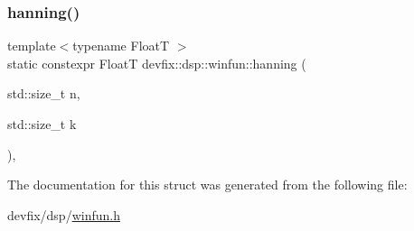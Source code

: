 \mbox{\label{structdevfix_1_1dsp_1_1winfun_a96c4fbf23b5738423ed34497cd498bd2}} 
\subsubsection{\texorpdfstring{hanning()}{hanning()}}
{\footnotesize\ttfamily template$<$typename FloatT $>$ \\
static constexpr FloatT devfix\+::dsp\+::winfun\+::hanning (\begin{DoxyParamCaption}\item[{std\+::size\+\_\+t}]{n,  }\item[{std\+::size\+\_\+t}]{k }\end{DoxyParamCaption})\hspace{0.3cm}{\ttfamily [inline]}, {\ttfamily [static]}}



The documentation for this struct was generated from the following file\+:\begin{DoxyCompactItemize}
\item 
devfix/dsp/\hyperlink{winfun_8h}{winfun.\+h}\end{DoxyCompactItemize}
